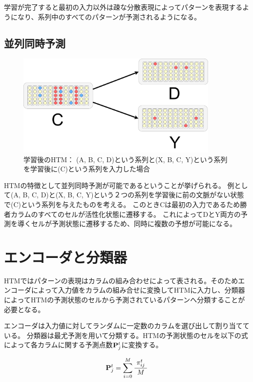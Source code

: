 学習が完了すると最初の入力以外は疎な分散表現によってパターンを表現するようになり、系列中のすべてのパターンが予測されるようになる。

\newpage
\subsection{並列同時予測}

\begin{figure}[ht]
  \begin{center}
    \includegraphics[width=10cm]{./fig/drawing_8}
    \caption{学習後のHTM： (A, B, C, D)という系列と(X, B, C, Y)という系列を学習後に(C)という系列を入力した場合}
    \label{fig:HTM_parallel_prediction}
  \end{center}
\end{figure}

HTMの特徴として並列同時予測が可能であるということが挙げられる。
例として(A, B, C, D)と(X, B, C, Y)という２つの系列を学習後に前の文脈がない状態で(C)という系列を与えたものを考える。
このときCは最初の入力であるため勝者カラムのすべてのセルが活性化状態に遷移する。
これによってDとY両方の予測を導くセルが予測状態に遷移するため、同時に複数の予想が可能になる。

\newpage
\section{エンコーダと分類器}
HTMではパターンの表現はカラムの組み合わせによって表される。そのためエンコーダによって入力値をカラムの組み合せに変換してHTMに入力し、分類器によってHTMの予測状態のセルから予測されているパターンへ分類することが必要となる。

エンコーダは入力値に対してランダムに一定数のカラムを選び出して割り当てている。
分類器は最尤予測を用いて分類する。HTMの予測状態のセルを以下の式によって各カラムに関する予測点数${\bf P}^t_j$に変換する。

\begin{equation}
  {\bf P}^t_j = \sum^{M}_{i=0} \frac{\pi^t_{ij}}{M}
\end{equation}

